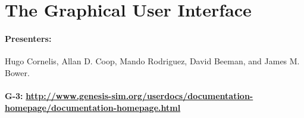 \documentclass[12pt]{article}
\begin{document}
\section{The Graphical User Interface}


\paragraph*{Presenters:}
Hugo Cornelis, Allan D. Coop, Mando Rodriguez, David Beeman, and James M. Bower. \\

 \\
{\bf G-3:} {\scriptsize \href{http://www.genesis-sim.org/userdocs/documentation-homepage/documentation-homepage.html}{\bf http://www.genesis-sim.org/userdocs/documentation-homepage/documentation-homepage.html}} \\
\end{document}
